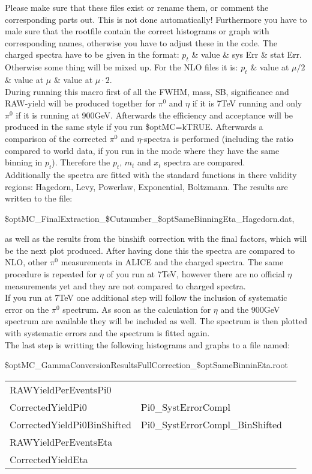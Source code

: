 	Please make sure that these files exist or rename them, or comment the corresponding parts out. This is not done automatically! Furthermore you have to male sure that the rootfile contain the correct histograms or graph with corresponding names, otherwise you have to adjust these in the code. The charged spectra have to be given in the format: $p_t$ \& value \& sys Err \& stat Err. Otherwise some thing will be mixed up. For the NLO files it is: $p_t$ \& value at $\mu/2$ \& value at $\mu$  \& value at $\mu \cdot 2$. \\
	During running this macro first of all the FWHM, mass, SB, significance and RAW-yield will be produced together for $\pi^0$ and $\eta$ if it is 7TeV running and only $\pi^0$ if it is running at 900GeV. Afterwards the efficiency and acceptance will be produced in the same style if you run \$optMC=kTRUE. Afterwards a comparison of the corrected $\pi^0$ and $\eta$-spectra is performed (including the ratio compared to world data, if you run in the mode where they have the same binning in $p_t$). Therefore the $p_t$, $m_t$ and $x_t$ spectra are compared.\\
	Additionally the spectra are fitted with the standard functions in there validity regions: Hagedorn, Levy, Powerlaw, Exponential, Boltzmann. The results are written to the file:
	\begin{center}
		\$optMC\_FinalExtraction\_\$Cutnumber\_\$optSameBinningEta\_Hagedorn.dat,
	\end{center}
	as well as the results from the binshift correction with the final factors, which will be the next plot produced. After having done this the spectra are compared to NLO, other $\pi^0$ measurements in ALICE and the charged spectra. The same procedure is repeated for $\eta$ of you run at 7TeV, however there are no official $\eta$ measurements yet and they are not compared to charged spectra.\\
	If you run at 7TeV one additional step will follow the inclusion of systematic error on the $\pi^0$ spectrum. As soon as the calculation for $\eta$ and the 900GeV spectrum are available they will be included as well. The spectrum is then plotted with systematic errors and the spectrum is fitted again.\\
	The last step is writting the following histograms and graphs to a file named:
	\begin{center}
	 	\$optMC\_GammaConversionResultsFullCorrection\_\$optSameBinninEta.root
	\end{center}
	\begin{table}[h!]
		\begin{tabular}{lll}
			RAWYieldPerEventsPi0 \\
			CorrectedYieldPi0 &  Pi0\_SystErrorCompl\\
			CorrectedYieldPi0BinShifted & Pi0\_SystErrorCompl\_BinShifted\\
			RAWYieldPerEventsEta\\		
			CorrectedYieldEta\\
		\end{tabular}
	\end{table}

